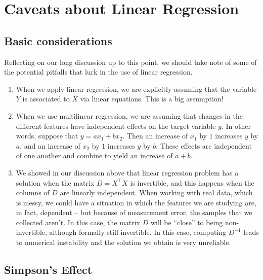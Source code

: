 \documentclass[
  oneside]{scrbook}
\begin{document}
\hypertarget{caveats-about-linear-regression}{%
\section{Caveats about Linear
Regression}\label{caveats-about-linear-regression}}

\hypertarget{basic-considerations}{%
\subsection{Basic considerations}\label{basic-considerations}}

Reflecting on our long discussion up to this point, we should take note
of some of the potential pitfalls that lurk in the use of linear
regression.

\begin{enumerate}
\def\labelenumi{\arabic{enumi}.}
\item
  When we apply linear regression, we are explicitly assuming that the
  variable \(Y\) is associated to \(X\) via linear equations. This is a
  big assumption!
\item
  When we use multilinear regression, we are assuming that changes in
  the different features have independent effects on the target variable
  \(y\). In other words, suppose that \(y=ax_1+bx_2\). Then an increase
  of \(x_1\) by \(1\) increases \(y\) by \(a\), and an increase of
  \(x_2\) by \(1\) increases \(y\) by \(b\). These effects are
  independent of one another and combine to yield an increase of
  \(a+b\).
\item
  We showed in our discussion above that linear regression problem has a
  solution when the matrix \(D=X^{\intercal}X\) is invertible, and this
  happens when the columns of \(D\) are linearly independent. When
  working with real data, which is messy, we could have a situation in
  which the features we are studying are, in fact, dependent -- but
  because of measurement error, the samples that we collected aren't. In
  this case, the matrix \(D\) will be ``close'' to being non-invertible,
  although formally still invertible. In this case, computing \(D^{-1}\)
  leads to numerical instability and the solution we obtain is very
  unreliable.
\end{enumerate}

\hypertarget{simpsons-effect}{%
\subsection{Simpson's Effect}\label{simpsons-effect}}
\end{document}

